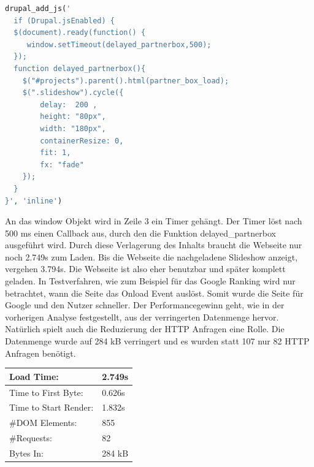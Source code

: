 \begin{minipage}[t]{1\textwidth}
\begin{lstlisting}[language=php,label=Javascript - Slideshow,caption=Javascript - Slideshow]
drupal_add_js('
  if (Drupal.jsEnabled) {
  $(document).ready(function() {
     window.setTimeout(delayed_partnerbox,500);
  });
  function delayed_partnerbox(){
	$("#projects").parent().html(partner_box_load);
	$(".slideshow").cycle({
	    delay:  200 ,
	    height: "80px",
	    width: "180px",
	    containerResize: 0,
	    fit: 1,
	    fx: "fade"
	});
  }
}', 'inline')
\end{lstlisting}
\end{minipage}
An das window Objekt wird in Zeile 3 ein Timer gehängt. Der Timer löst nach 500 ms einen Callback aus, durch den die Funktion delayed\_partnerbox ausgeführt wird. Durch diese Verlagerung des Inhalts braucht die Webseite nur noch 2.749s zum Laden. Bis die Webseite die nachgeladene Slideshow anzeigt, vergehen 3.794s. Die Webseite ist also eher benutzbar und später komplett geladen. In Testverfahren, wie zum Beispiel für das Google Ranking wird nur betrachtet, wann die Seite das Onload Event auslöst. Somit wurde die Seite für Google und den Nutzer schneller. Der Performancegewinn geht, wie in der vorherigen Analyse festgestellt, aus der verringerten Datenmenge hervor. Natürlich spielt auch die Reduzierung der HTTP Anfragen eine Rolle. Die Datenmenge wurde auf 284 kB verringert und es wurden statt 107 nur 82 HTTP Anfragen benötigt.

\begin{table}
\caption{Ergebnis der Umprogrammierung der Partner-Slideshow}
    \begin{longtable}{ | p{3cm} | p{1.5cm} | }
    \hline
    Load Time: 			& 2.749s 	\\ \hline
    Time to First Byte:		& 0.626s  	\\ \hline
    Time to Start Render:	& 1.832s	\\ \hline
    \#DOM Elements:		& 855 		\\ \hline
    \#Requests:			& 82 		\\ \hline
    Bytes In:			& 284 kB 	\\ \hline
    \hline
    \end{longtable}
\end{table}


